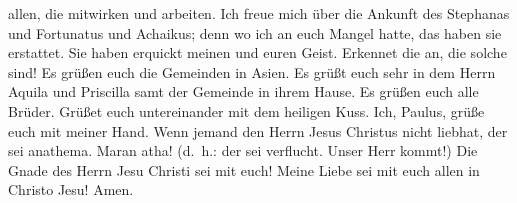 allen, die mitwirken und arbeiten.  Ich freue mich über die
Ankunft des Stephanas und Fortunatus und Achaikus; denn wo ich an euch
Mangel hatte, das haben sie erstattet.  Sie haben erquickt
meinen und euren Geist. Erkennet die an, die solche sind! 
Es grüßen euch die Gemeinden in Asien. Es grüßt euch sehr in dem Herrn
Aquila und Priscilla samt der Gemeinde in ihrem Hause.  Es
grüßen euch alle Brüder. Grüßet euch untereinander mit dem heiligen
Kuss.  Ich, Paulus, grüße euch mit meiner Hand.
 Wenn jemand den Herrn Jesus Christus nicht liebhat, der
sei anathema. Maran atha! (d.~h.: der sei verflucht. Unser Herr kommt!)
 Die Gnade des Herrn Jesu Christi sei mit euch!
 Meine Liebe sei mit euch allen in Christo Jesu! Amen.
